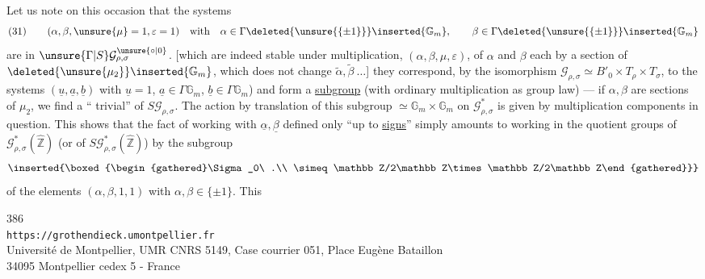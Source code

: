 Let us note on this occasion that the systems
\[
(31)\qquad
(\alpha,\beta,\unsure{\mu}=1,\varepsilon=1)
\quad\text{with}\quad
\alpha\in\Gamma\deleted{\unsure{\{\pm1\}}}\inserted{\mathbb G_m},\qquad
\beta\in\Gamma\deleted{\unsure{\{\pm1\}}}\inserted{\mathbb G_m}
\]
are in $\unsure{\Gamma|S}\mathcal G_{\rho,\sigma}^{\unsure{\circ|0}}$.
[which are indeed stable under multiplication,  $(\alpha,\beta,\mu,\varepsilon)$, of $\alpha$ and $\beta$ each by a section of $\deleted{\unsure{\mu_2}}\inserted{\mathbb G_m}$, which does not change $\widetilde\alpha,\widetilde\beta\ \ldots$]
they correspond, by the isomorphism $\mathcal G_{\rho,\sigma}\simeq B'_0\times T_\rho\times T_\sigma$, to the systems $(\underline u,\underline a,\underline b)$ with $\underline u=1$, $\underline a\in\Gamma\mathbb G_m$, $\underline b\in\Gamma\mathbb G_m$) and form a \uline{subgroup} (with ordinary multiplication    as group law) --- if $\alpha,\beta$ are sections of $\mu_2$, we find a   `` trivial''  of $S\mathcal G_{\rho,\sigma}$.
The action by translation of this subgroup $\simeq\mathbb G_m\times\mathbb G_m$ on $\mathcal G_{\rho,\sigma}^{*}$ is given by multiplication    components in question. This shows that the fact of working with $\underline\alpha,\underline\beta$ defined only ``up to \uline{signs}'' simply amounts to working in the quotient groups of \uline{$\mathcal G_{\rho,\sigma}^{*}(\widehat{\mathbb Z})$} (or of $S\mathcal G_{\rho,\sigma}^{*}(\widehat{\mathbb Z})$) by the subgroup
\[
\inserted{\boxed{\begin{gathered}\Sigma_0\ .\\ \simeq\mathbb Z/2\mathbb Z\times\mathbb Z/2\mathbb Z\end{gathered}}}
\]
 of the elements $(\alpha,\beta,1,1)$ with $\alpha,\beta\in\{\pm1\}$. This

\begin{center}
386\\
\texttt{https://grothendieck.umontpellier.fr}\\
Université de Montpellier, UMR CNRS 5149, Case courrier 051, Place Eugène Bataillon\\
34095 Montpellier cedex 5 - France
\end{center}

